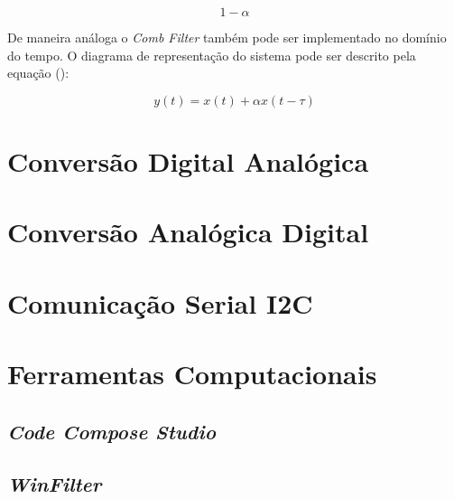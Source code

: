 		
		
		\begin{equation}
			1-\alpha
		\end{equation}
		
		
		
		De maneira análoga o \textit{Comb Filter} também pode ser implementado no domínio do tempo. O diagrama de representação do sistema pode ser descrito pela equação ():
		
		\begin{equation}
			y(t) = x(t) + \alpha x(t-\tau)
			\label{eq05-combfilter}
		\end{equation}
		
		
		
\section{Conversão Digital Analógica}

\section{Conversão Analógica Digital}

\section{Comunicação Serial I2C}
	
\section{Ferramentas Computacionais}

	\subsection{\textit{Code Compose Studio}}
	
	\subsection{\textit{WinFilter}}
